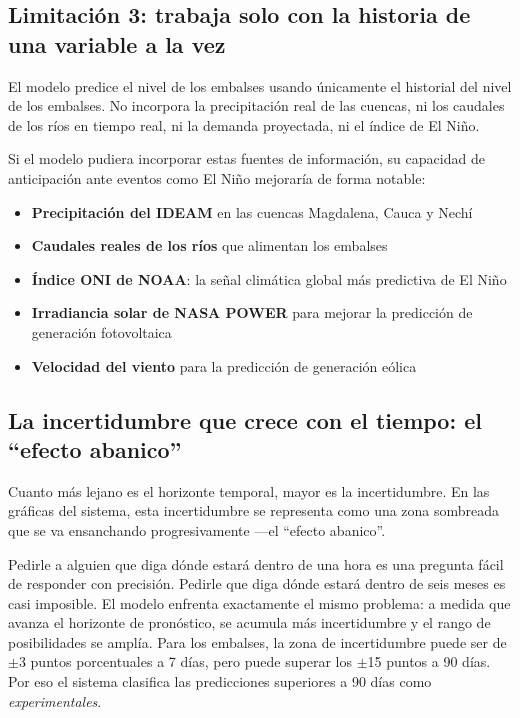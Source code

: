 \documentclass[11pt,a4paper]{article}
\begin{document}
\subsection{Limitación 3: trabaja solo con la historia de una variable a la vez}

El modelo predice el nivel de los embalses usando únicamente el historial del nivel de los embalses. No incorpora la precipitación real de las cuencas, ni los caudales de los ríos en tiempo real, ni la demanda proyectada, ni el índice de El Niño.

\begin{infobox}
Si el modelo pudiera incorporar estas fuentes de información, su capacidad de anticipación ante eventos como El Niño mejoraría de forma notable:
\begin{itemize}[noitemsep,leftmargin=*]
\item \textbf{Precipitación del IDEAM} en las cuencas Magdalena, Cauca y Nechí
\item \textbf{Caudales reales de los ríos} que alimentan los embalses
\item \textbf{Índice ONI de NOAA}: la señal climática global más predictiva de El Niño
\item \textbf{Irradiancia solar de NASA POWER} para mejorar la predicción de generación fotovoltaica
\item \textbf{Velocidad del viento} para la predicción de generación eólica
\end{itemize}
\end{infobox}

\subsection{La incertidumbre que crece con el tiempo: el ``efecto abanico''}

Cuanto más lejano es el horizonte temporal, mayor es la incertidumbre. En las gráficas del sistema, esta incertidumbre se representa como una zona sombreada que se va ensanchando progresivamente —el ``efecto abanico''.

\begin{highlightbox}
Pedirle a alguien que diga dónde estará dentro de una hora es una pregunta fácil de responder con precisión. Pedirle que diga dónde estará dentro de seis meses es casi imposible. El modelo enfrenta exactamente el mismo problema: a medida que avanza el horizonte de pronóstico, se acumula más incertidumbre y el rango de posibilidades se amplía. Para los embalses, la zona de incertidumbre puede ser de $\pm$3 puntos porcentuales a 7 días, pero puede superar los $\pm$15 puntos a 90 días. Por eso el sistema clasifica las predicciones superiores a 90 días como \textit{experimentales}.
\end{highlightbox}
\end{document}

